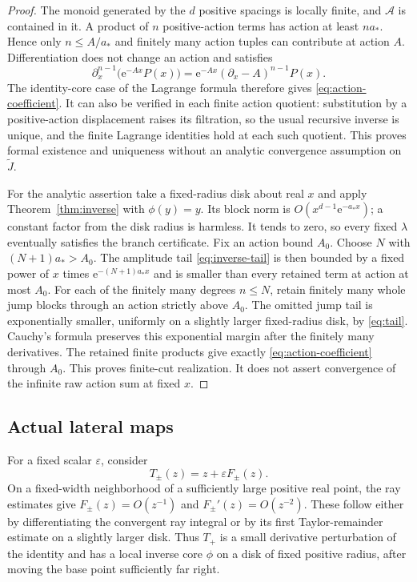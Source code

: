 \documentclass[11pt,a4paper]{article}
\numberwithin{equation}{section}
\theoremstyle{definition}
\theoremstyle{remark}
\newcommand{\e}{\mathrm e}
\begin{document}
\begin{proof}
The monoid generated by the $d$ positive spacings is locally finite, and
$\mathcal A$ is contained in it. A product of $n$ positive-action terms
has action at least $na_*$. Hence only $n\le A/a_*$ and finitely many
action tuples can contribute at action $A$. Differentiation does not
change an action and satisfies
\[
 \partial_x^{n-1}\bigl(\e^{-Ax}P(x)\bigr)
   =\e^{-Ax}(\partial_x-A)^{n-1}P(x).
\]
The identity-core case of the Lagrange formula therefore gives
\eqref{eq:action-coefficient}. It can also be verified in each finite
action quotient: substitution by a positive-action displacement raises
its filtration, so the usual recursive inverse is unique, and the finite
Lagrange identities hold at each such quotient. This proves formal
existence and uniqueness without an analytic convergence assumption on
$\widetilde J$.

For the analytic assertion take a fixed-radius disk about real $x$ and
apply Theorem~\ref{thm:inverse} with $\phi(y)=y$. Its block norm is
$O(x^{d-1}\e^{-a_*x})$; a constant factor from the disk radius is harmless.
It tends to zero, so every fixed $\lambda$ eventually satisfies the branch
certificate. Fix an action bound $A_0$. Choose $N$ with
$(N+1)a_*>A_0$. The amplitude tail \eqref{eq:inverse-tail} is then bounded
by a fixed power of $x$ times $\e^{-(N+1)a_*x}$ and is smaller than every
retained term at action at most $A_0$.
For each of the finitely many degrees $n\le N$, retain finitely many
whole jump blocks through an action strictly above $A_0$. The omitted
jump tail is exponentially smaller, uniformly on a slightly larger
fixed-radius disk, by \eqref{eq:tail}. Cauchy's formula preserves this
exponential margin after the finitely many derivatives. The retained
finite products give exactly \eqref{eq:action-coefficient} through
$A_0$. This proves finite-cut realization. It does not assert convergence
of the infinite raw action sum at fixed $x$.
\end{proof}

\subsection{Actual lateral maps}
For a fixed scalar $\varepsilon$, consider
\begin{equation}
 T_\pm(z)=z+\varepsilon F_\pm(z).
 \label{eq:actual-maps}
\end{equation}
On a fixed-width neighborhood of a sufficiently large positive real
point, the ray estimates give $F_\pm(z)=O(z^{-1})$ and
$F_\pm'(z)=O(z^{-2})$. These follow either by differentiating the
convergent ray integral or by its first Taylor-remainder estimate on a
slightly larger disk. Thus $T_+$ is a small derivative perturbation of
the identity and has a local inverse core $\phi$ on a disk of fixed
positive radius, after moving the base point sufficiently far right.
\end{document}
